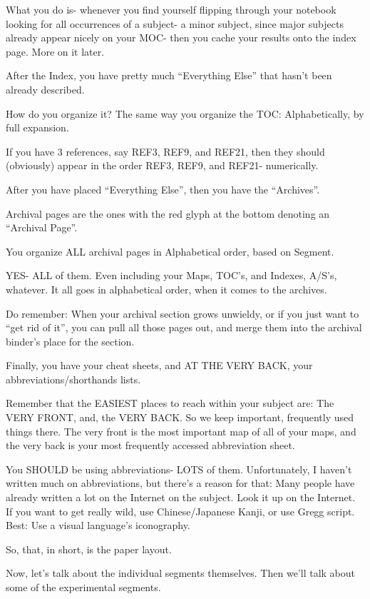 \documentclass[oneside]{book}
\begin{document}
What you do is- whenever you find yourself flipping through your
notebook looking for all occurrences of a subject- a minor subject,
since major subjects already appear nicely on your MOC- then you cache
your results onto the index page. More on it later.

After the Index, you have pretty much ``Everything Else'' that hasn't
been already described.

How do you organize it? The same way you organize the TOC:
Alphabetically, by full expansion.

If you have 3 references, say REF3, REF9, and REF21, then they should
(obviously) appear in the order REF3, REF9, and REF21- numerically.

After you have placed ``Everything Else'', then you have the ``Archives''.

Archival pages are the ones with the red glyph at the bottom denoting
an ``Archival Page''.

You organize ALL archival pages in Alphabetical order, based on
Segment.

YES- ALL of them. Even including your Maps, TOC's, and Indexes, A/S's,
whatever. It all goes in alphabetical order, when it comes to the
archives.

Do remember: When your archival section grows unwieldy, or if you just
want to ``get rid of it'', you can pull all those pages out, and merge
them into the archival binder's place for the section.

Finally, you have your cheat sheets, and AT THE VERY BACK, your
abbreviations/shorthands lists.

Remember that the EASIEST places to reach within your subject are: The
VERY FRONT, and, the VERY BACK. So we keep important, frequently used
things there. The very front is the most important map of all of your
maps, and the very back is your most frequently accessed abbreviation
sheet.

You SHOULD be using abbreviations- LOTS of them. Unfortunately, I
haven't written much on abbreviations, but there's a reason for that:
Many people have already written a lot on the Internet on the
subject. Look it up on the Internet. If you want to get really wild,
use Chinese/Japanese Kanji, or use Gregg script. Best: Use a visual
language's iconography.

So, that, in short, is the paper layout.

Now, let's talk about the individual segments themselves. Then we'll
talk about some of the experimental segments.
\end{document}
